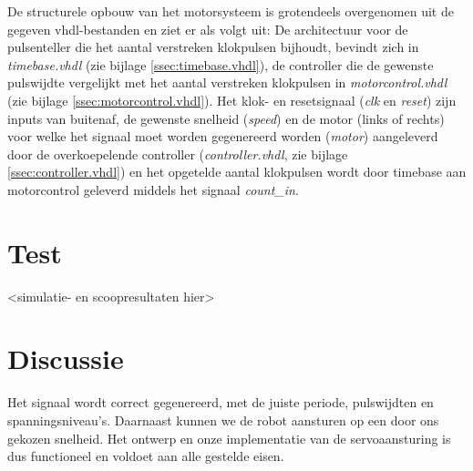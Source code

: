 \documentclass{report}
\begin{document}
De structurele opbouw van het motorsysteem is grotendeels overgenomen uit de gegeven vhdl-bestanden en ziet er als volgt uit:
De architectuur voor de pulsenteller die het aantal verstreken klokpulsen bijhoudt, bevindt zich in \textit{timebase.vhdl} (zie bijlage \ref{ssec:timebase.vhdl}), de controller die de gewenste pulswijdte vergelijkt met het aantal verstreken klokpulsen in \textit{motorcontrol.vhdl} (zie bijlage \ref{ssec:motorcontrol.vhdl}).
Het klok- en resetsignaal (\textit{clk} en \textit{reset}) zijn inputs van buitenaf, de gewenste snelheid (\textit{speed}) en de motor (links of rechts) voor welke het signaal moet worden gegenereerd worden (\textit{motor}) aangeleverd door de overkoepelende controller (\textit{controller.vhdl}, zie bijlage \ref{ssec:controller.vhdl}) en het opgetelde aantal klokpulsen wordt door timebase aan motorcontrol geleverd middels het signaal \textit{count\_in}.

\section{Test}
\label{sec:servo-test}

<simulatie- en scoopresultaten hier>

\section{Discussie}
\label{sec:servo-disc}

Het signaal wordt correct gegenereerd, met de juiste periode, pulswijdten en spanningsniveau's.
Daarnaast kunnen we de robot aansturen op een door ons gekozen snelheid.
Het ontwerp en onze implementatie van de servoaansturing is dus functioneel en voldoet aan alle gestelde eisen.
\end{document}
